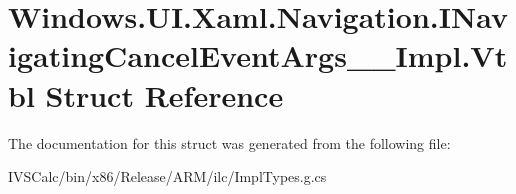 \hypertarget{struct_windows_1_1_u_i_1_1_xaml_1_1_navigation_1_1_i_navigating_cancel_event_args_____impl_1_1_vtbl}{}\section{Windows.\+U\+I.\+Xaml.\+Navigation.\+I\+Navigating\+Cancel\+Event\+Args\+\_\+\+\_\+\+Impl.\+Vtbl Struct Reference}
\label{struct_windows_1_1_u_i_1_1_xaml_1_1_navigation_1_1_i_navigating_cancel_event_args_____impl_1_1_vtbl}


The documentation for this struct was generated from the following file\+:\begin{DoxyCompactItemize}
\item 
I\+V\+S\+Calc/bin/x86/\+Release/\+A\+R\+M/ilc/Impl\+Types.\+g.\+cs\end{DoxyCompactItemize}
